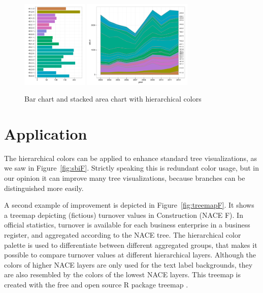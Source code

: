 \documentclass[journal]{vgtc}                %
\begin{document}
\begin{figure}[htb]
  \centering
  \includegraphics[width=1.235in]{bar_chart.pdf}
  \includegraphics[width=2.065in]{stackedarea_chart.pdf}
  \vspace{-5ex}
  \caption{Bar chart and stacked area chart with hierarchical colors}\label{fig:charts}
  \vspace{-4ex}
\end{figure}



\section{Application}\label{secapplication}
The hierarchical colors can be applied to enhance standard tree visualizations, as we saw in Figure~\ref{fig:sbiF}. Strictly speaking this is redundant color usage, but in our opinion it can improve many tree visualizations, because branches can be distinguished more easily. 

A second example of improvement is depicted in Figure~\ref{fig:treemapF}. It shows a treemap depicting (fictious) turnover values in Construction (NACE F). In official statistics, turnover is available for each business enterprise in a business register, and aggregated according to the NACE tree. The hierarchical color palette is used to differentiate between different aggregated groups, that makes it possible to compare turnover values at different hierarchical layers. Although the colors of higher NACE layers are only used for the text label backgrounds, they are also resembled by the colors of the lowest NACE layers. This treemap is created with the free and open source R package treemap \cite{treemap}.
\end{document}
